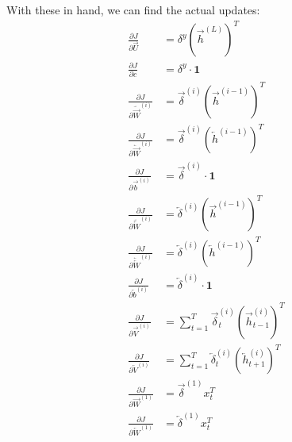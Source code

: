 \documentclass[12pt]{article}
\newcommand{\pdeq}[2]{\frac{\partial #1}{\partial #2}}
\begin{document}
    With these in hand, we can find the actual updates:
    \begin{align}
      \pdeq{J}{\overrightarrow{U}} &= \delta^y (\overrightarrow{h}^{(L)})^T \\
      \pdeq{J}{c} &= \delta^y \cdot \mathbf{1} \\
      \pdeq{J}{\underrightarrow{\overrightarrow{W}}^{(i)}} &= \overrightarrow{\delta}^{(i)} (\overrightarrow{h}^{(i-1)})^T \\
      \pdeq{J}{\underleftarrow{\overrightarrow{W}}^{(i)}} &= \overrightarrow{\delta}^{(i)} (\overleftarrow{h}^{(i-1)})^T \\
      \pdeq{J}{\overrightarrow{b}^{(i)}} &= \overrightarrow{\delta}^{(i)} \cdot \mathbf{1} \\
      \pdeq{J}{\underrightarrow{\overleftarrow{W}}^{(i)}} &= \overleftarrow{\delta}^{(i)} (\overrightarrow{h}^{(i-1)})^T \\
      \pdeq{J}{\underleftarrow{\overleftarrow{W}}^{(i)}} &= \overleftarrow{\delta}^{(i)} (\overleftarrow{h}^{(i-1)})^T \\
      \pdeq{J}{\overleftarrow{b}^{(i)}} &= \overleftarrow{\delta}^{(i)} \cdot \mathbf{1} \\
      \pdeq{J}{\overrightarrow{V}^{(i)}} &= \sum_{t=1}^T \overrightarrow{\delta}_t^{(i)} (\overrightarrow{h}_{t-1}^{(i)})^T \\
      \pdeq{J}{\overleftarrow{V}^{(i)}} &= \sum_{t=1}^T \overleftarrow{\delta}_t^{(i)} (\overleftarrow{h}_{t+1}^{(i)})^T \\
      \pdeq{J}{\overrightarrow{W}^{(1)}} &= \overrightarrow{\delta}^{(1)} x_t^T \\
      \pdeq{J}{\overleftarrow{W}^{(1)}} &= \overleftarrow{\delta}^{(1)} x_t^T
    \end{align}
\end{document}

